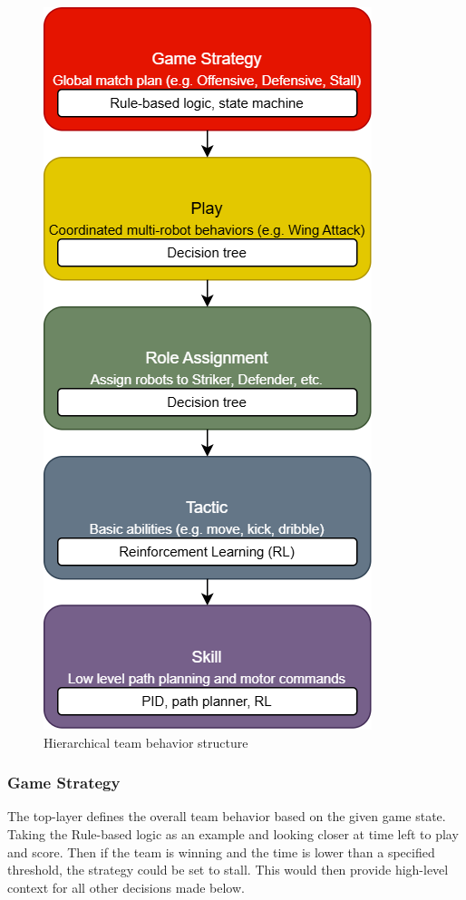 \begin{figure}[h]
    \centering
    \includegraphics[width=0.8\linewidth]{./StrategyHierarchy.png}
    \caption{Hierarchical team behavior structure}
    \label{fig:strategy_hierarchy}
\end{figure}

\subsubsection{Game Strategy}
The top-layer defines the overall team behavior based on the given game state.
Taking the Rule-based logic as an example and looking closer at time left to play and score.
Then if the team is winning and the time is lower than a specified threshold, the strategy could be set to stall. This would then provide high-level context for all other decisions made below.

